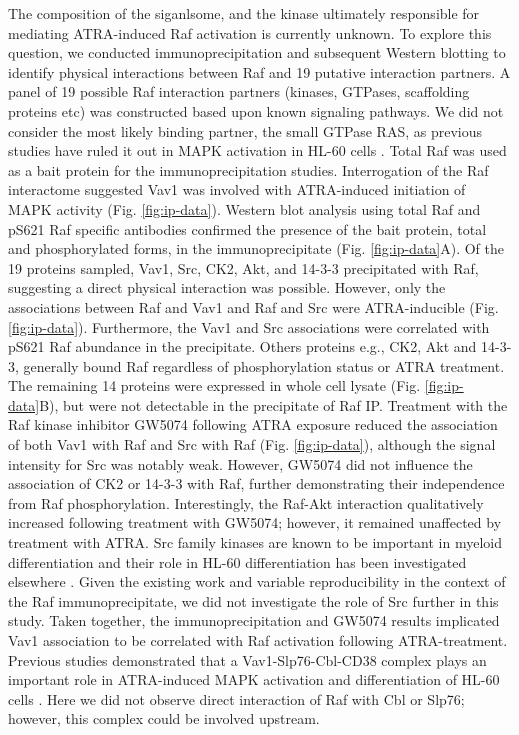 \documentclass[12pt]{article}
\begin{document}
The composition of the siganlsome, and the kinase ultimately responsible for mediating ATRA-induced Raf activation is currently unknown.
To explore this question, we conducted immunoprecipitation and subsequent Western blotting to identify physical interactions between Raf and 19 putative interaction partners.
A panel of 19 possible Raf interaction partners (kinases, GTPases, scaffolding proteins etc)
was constructed based upon known signaling pathways.
We did not consider the most likely binding partner,
the small GTPase RAS, as previous studies have ruled it out in MAPK activation in HL-60 cells \cite{Wang2008,Katagiri1994}.
Total Raf was used as a bait protein for the immunoprecipitation studies.
Interrogation of the Raf interactome suggested Vav1 was involved with ATRA-induced initiation of MAPK activity (Fig. \ref{fig:ip-data}).
Western blot analysis using total Raf and pS621 Raf specific antibodies confirmed the
presence of the bait protein, total and phosphorylated forms, in the immunoprecipitate (Fig. \ref{fig:ip-data}A).
Of the 19 proteins sampled, Vav1, Src, CK2, Akt, and 14-3-3 precipitated with Raf, suggesting a direct physical interaction was possible.
However, only the associations between Raf and Vav1 and Raf and Src were ATRA-inducible (Fig. \ref{fig:ip-data}).
Furthermore, the Vav1 and Src associations were correlated with pS621 Raf abundance in the precipitate.
Others proteins e.g., CK2, Akt and 14-3-3, generally bound Raf regardless of phosphorylation status or ATRA treatment.
The remaining 14 proteins were expressed in whole cell lysate (Fig. \ref{fig:ip-data}B),
but were not detectable in the precipitate of Raf IP.
Treatment with the Raf kinase inhibitor GW5074 following ATRA exposure reduced the association of both Vav1 with Raf and Src with Raf (Fig. \ref{fig:ip-data}),
although the signal intensity for Src was notably weak.
However, GW5074 did not influence the association of CK2 or 14-3-3 with Raf, further demonstrating their independence from Raf phosphorylation.
Interestingly, the Raf-Akt interaction qualitatively increased following treatment with GW5074;
however, it remained unaffected by treatment with ATRA.
Src family kinases are known to be important in myeloid differentiation \cite{Miranda2007} and their role in HL-60 differentiation has been investigated elsewhere \cite{Congleton:2012fk}.
Given the existing work and variable reproducibility in the context of the Raf immunoprecipitate,
we did not investigate the role of Src further in this study.
Taken together, the immunoprecipitation and GW5074 results implicated Vav1 association to be correlated with Raf activation following ATRA-treatment.
Previous studies demonstrated that a Vav1-Slp76-Cbl-CD38 complex plays an important role in ATRA-induced MAPK activation and differentiation of HL-60 cells \cite{Shen2009}.
Here we did not observe direct interaction of Raf with Cbl or Slp76;
however, this complex could be involved upstream.
\end{document}
